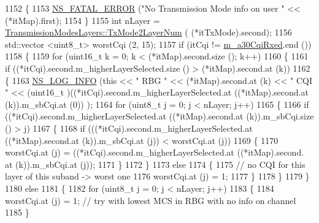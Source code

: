 \begin{DoxyCode}
1152         \{
1153           \hyperlink{group__fatal_ga5131d5e3f75d7d4cbfd706ac456fdc85}{NS\_FATAL\_ERROR} (\textcolor{stringliteral}{"No Transmission Mode info on user "} << (*itMap).first);
1154         \}
1155       \textcolor{keywordtype}{int} nLayer = \hyperlink{classns3_1_1TransmissionModesLayers_a31f608b7bfaa77440fe4cb85ad035329}{TransmissionModesLayers::TxMode2LayerNum} (
      (*itTxMode).second);
1156       std::vector <uint8\_t> worstCqi (2, 15);
1157       \textcolor{keywordflow}{if} (itCqi != \hyperlink{classns3_1_1FdMtFfMacScheduler_a21ff76bdadf27aac3b87c43f3bc343c8}{m\_a30CqiRxed}.end ())
1158         \{
1159           \textcolor{keywordflow}{for} (uint16\_t k = 0; k < (*itMap).second.size (); k++)
1160             \{
1161               \textcolor{keywordflow}{if} ((*itCqi).second.m\_higherLayerSelected.size () > (*itMap).second.at (k))
1162                 \{
1163                   \hyperlink{group__logging_gafbd73ee2cf9f26b319f49086d8e860fb}{NS\_LOG\_INFO} (\textcolor{keyword}{this} << \textcolor{stringliteral}{" RBG "} << (*itMap).second.at (k) << \textcolor{stringliteral}{" CQI "} << (uint16\_t
      )((*itCqi).second.m\_higherLayerSelected.at ((*itMap).second.at (k)).m\_sbCqi.at (0)) );
1164                   \textcolor{keywordflow}{for} (uint8\_t j = 0; j < nLayer; j++)
1165                     \{
1166                       \textcolor{keywordflow}{if} ((*itCqi).second.m\_higherLayerSelected.at ((*itMap).second.at (k)).m\_sbCqi.size ()
       > j)
1167                         \{
1168                           \textcolor{keywordflow}{if} (((*itCqi).second.m\_higherLayerSelected.at ((*itMap).second.at (k)).m\_sbCqi.at
       (j)) < worstCqi.at (j))
1169                             \{
1170                               worstCqi.at (j) = ((*itCqi).second.m\_higherLayerSelected.at ((*itMap).second.
      at (k)).m\_sbCqi.at (j));
1171                             \}
1172                         \}
1173                       \textcolor{keywordflow}{else}
1174                         \{
1175                           \textcolor{comment}{// no CQI for this layer of this suband -> worst one}
1176                           worstCqi.at (j) = 1;
1177                         \}
1178                     \}
1179                 \}
1180               \textcolor{keywordflow}{else}
1181                 \{
1182                   \textcolor{keywordflow}{for} (uint8\_t j = 0; j < nLayer; j++)
1183                     \{
1184                       worstCqi.at (j) = 1; \textcolor{comment}{// try with lowest MCS in RBG with no info on channel}
1185                     \}

\end{DoxyCode}
